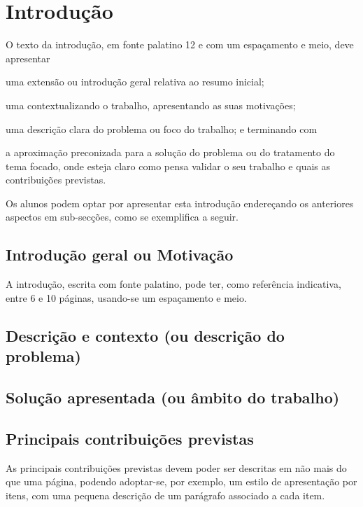\chapter{Introdução}
\label{cha:introducao}

O texto da introdução, em fonte palatino 12 e com um espaçamento e meio, deve apresentar
\begin{inparaenum}[i)]
\item uma extensão ou introdução geral relativa ao resumo inicial;
\item uma contextualizando o trabalho, apresentando as suas motivações;
\item uma descrição clara do problema ou foco do trabalho; e terminando com
\item a aproximação preconizada para a solução do problema ou do tratamento do tema focado, onde esteja claro como pensa validar o seu trabalho e quais as contribuições previstas.
\end{inparaenum}

Os alunos podem optar por apresentar esta introdução endereçando os anteriores aspectos em sub-secções, como se exemplifica a seguir.



\section{Introdução geral ou Motivação}
\label{sec:introducao}

A introdução, escrita com fonte palatino, pode ter, como referência indicativa, entre 6 e 10 páginas, usando-se um espaçamento e meio.

\section{Descrição e contexto (ou descrição do problema)}
\label{sec:descricao}

\section{Solução apresentada (ou âmbito do trabalho)} 
\label{sec:solucao}

\section{Principais contribuições previstas} 
\label{sec:contribuicoes}

As principais contribuições previstas devem poder ser descritas em não mais do que uma página, podendo adoptar-se, por exemplo, um estilo de apresentação por itens, com uma pequena descrição de um parágrafo associado a cada item.

